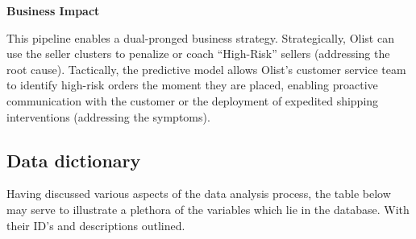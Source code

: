 \documentclass[
]{article}
\begin{document}
\textbf{Business Impact}

This pipeline enables a dual-pronged business strategy. Strategically,
Olist can use the seller clusters to penalize or coach ``High-Risk''
sellers (addressing the root cause). Tactically, the predictive model
allows Olist's customer service team to identify high-risk orders the
moment they are placed, enabling proactive communication with the
customer or the deployment of expedited shipping interventions
(addressing the symptoms).

\subsection{Data dictionary}\label{data-dictionary}

Having discussed various aspects of the data analysis process, the table
below may serve to illustrate a plethora of the variables which lie in
the database. With their ID's and descriptions outlined.
\end{document}
